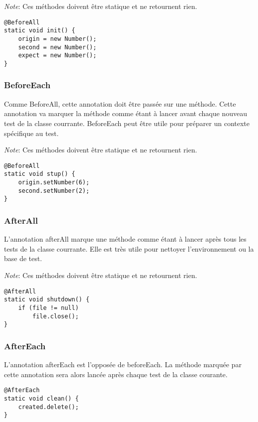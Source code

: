 \documentclass[12pt]{article}		%
\begin{document}
\textit{Note}: Ces méthodes doivent être statique et ne retournent rien.

\lstset{language=Java, numbers=left}
\begin{lstlisting}
@BeforeAll
static void init() {
    origin = new Number();
    second = new Number();
    expect = new Number();
}
\end{lstlisting}

\subsubsection{BeforeEach}

Comme BeforeAll, cette annotation doit être passée sur une méthode. Cette annotation va marquer la méthode comme étant à lancer avant chaque nouveau test de la classe courrante. BeforeEach peut être utile pour préparer un contexte spécifique au test.

\textit{Note}: Ces méthodes doivent être statique et ne retournent rien.

\lstset{language=Java, numbers=left}
\begin{lstlisting}
@BeforeAll
static void stup() {
    origin.setNumber(6);
    second.setNumber(2);
}
\end{lstlisting}

\subsubsection{AfterAll}

L'annotation afterAll marque une méthode comme étant à lancer après tous les tests de la classe courrante. Elle est très utile pour nettoyer l'environnement ou la base de test.

\textit{Note}: Ces méthodes doivent être statique et ne retournent rien.

\lstset{language=Java, numbers=left}
\begin{lstlisting}
@AfterAll
static void shutdown() {
    if (file != null)
        file.close();
}
\end{lstlisting}

\subsubsection{AfterEach}

L'annotation afterEach est l'opposée de beforeEach. La méthode marquée par cette annotation sera alors lancée après chaque test de la classe courante.

\lstset{language=Java, numbers=left}
\begin{lstlisting}
@AfterEach
static void clean() {
    created.delete();
}
\end{lstlisting}
\end{document}
